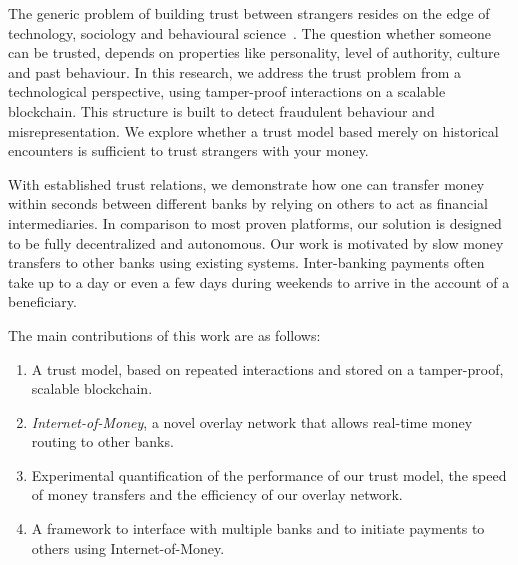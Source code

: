 The generic problem of building trust between strangers resides on the edge of technology, sociology and behavioural science~\cite{yan2008trust}.
The question whether someone can be trusted, depends on properties like personality, level of authority, culture and past behaviour. %
In this research, we address the trust problem from a technological perspective, using tamper-proof interactions on a scalable blockchain.
This structure is built to detect fraudulent behaviour and misrepresentation.
We explore whether a trust model based merely on historical encounters is sufficient to trust strangers with your money.

With established trust relations, we demonstrate how one can transfer money within seconds between different banks by relying on others to act as financial intermediaries.
In comparison to most proven platforms, our solution is designed to be fully decentralized and autonomous. %
Our work is motivated by slow money transfers to other banks using existing systems. %
Inter-banking payments often take up to a day or even a few days during weekends to arrive in the account of a beneficiary.

The main contributions of this work are as follows:
\begin{enumerate}
	\item A trust model, based on repeated interactions and stored on a tamper-proof, scalable blockchain.
	\item \emph{Internet-of-Money}, a novel overlay network that allows real-time money routing to other banks.
	\item Experimental quantification of the performance of our trust model, the speed of money transfers and the efficiency of our overlay network.
	\item A framework to interface with multiple banks and to initiate payments to others using Internet-of-Money.
\end{enumerate}

